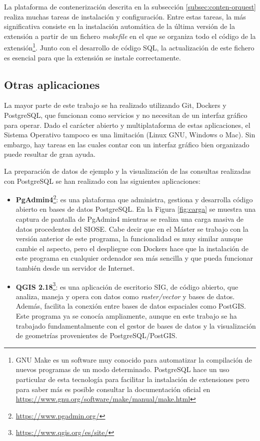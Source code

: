 La plataforma de contenerización descrita en la subsección \ref{subsec:conten-orquest} realiza muchas tareas de instalación y configuración. Entre estas tareas, la más significativa consiste en la instalación automática de la última versión de la extensión a partir de un fichero \textit{makefile} en el que se organiza todo el código de la extensión\footnote{GNU Make es un software muy conocido para automatizar la compilación de nuevos programas de un modo determinado. PostgreSQL hace un uso particular de esta tecnología para facilitar la instalación de extensiones pero para saber más es posible consultar la documentación oficial en \href{https://www.gnu.org/software/make/manual/make.html}{https://www.gnu.org/software/make/manual/make.html}}. Junto con el desarrollo de código SQL, la actualización de este fichero es esencial para que la extensión se instale correctamente.


\subsection{Otras aplicaciones}\label{subsec:aplic}

La mayor parte de este trabajo se ha realizado utilizando Git, Dockers y PostgreSQL, que funcionan como servicios y no necesitan de un interfaz gráfico para operar. Dado el carácter abierto y multiplataforma de estas aplicaciones, el Sistema Operativo tampoco es una limitación (Linux GNU, Windows o Mac). Sin embargo, hay tareas en las cuales contar con un interfaz gráfico bien organizado puede resultar de gran ayuda.

La preparación de datos de ejemplo y la visualización de las consultas realizadas con PostgreSQL se han realizado con las siguientes aplicaciones:

\begin{itemize}
\item\textbf{PgAdmin4}\footnote{\url{https://www.pgadmin.org/}}: es una plataforma que administra, gestiona y desarrolla código abierto en bases de datos PostgreSQL. En la Figura \ref{fig:carga} se muestra una captura de pantalla de PgAdmin4 mientras se realiza una carga masiva de datos procedentes del SIOSE. Cabe decir que en el Máster se trabajo con la versión anterior de este programa, la funcionalidad es muy similar aunque cambie el aspecto, pero el despliegue con Dockers hace que la instalación de este programa en cualquier ordenador sea más sencilla y que pueda funcionar también desde un servidor de Internet.
\item\textbf{QGIS 2.18}\footnote{\url{https://www.qgis.org/es/site/}}: es una aplicación de escritorio SIG, de código abierto, que analiza, maneja y opera con datos como \textit{raster/vector} y bases de datos. Además, facilita la conexión entre bases de datos espaciales como PostGIS. Este programa ya se conocía ampliamente, aunque en este trabajo se ha trabajado fundamentalmente con el gestor de bases de datos y la visualización de geometrías provenientes de PostgreSQL/PostGIS.
\end{itemize}

